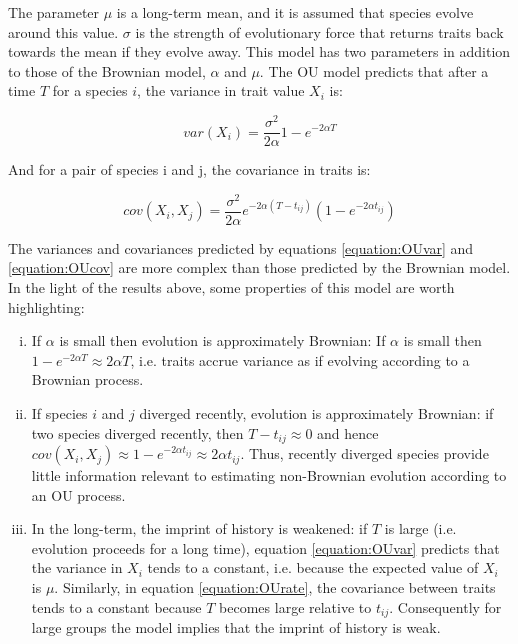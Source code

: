 \documentclass[a4paper,12pt]{article}
\begin{document}
  The parameter $\mu$ is a long-term mean, and it is assumed that species evolve around this value. 
  $\sigma$ is the strength of evolutionary force that returns traits back towards the mean if they evolve away. 
  This model has two parameters in addition to those of the Brownian model, $\alpha$ and $\mu$.
  The OU model predicts that after a time $T$ for a species $i$, the variance in trait value $X_i$ is:

    \begin{equation}
      var(X_i) = \frac{\sigma^2}{2 \alpha} 1 - e^{-2 \alpha T}
      \label{equation:OUvar} 
    \end{equation}

  And for a pair of species i and j, the covariance in traits is:

    \begin{equation}
      cov(X_i, X_j) = \frac{\sigma^2}{2 \alpha} e^{-2 \alpha (T - t_{ij})} (1 - e^{-2\alpha t_{ij}})
      \label{equation:OUcov} 
    \end{equation}

  The variances and covariances predicted by equations \ref{equation:OUvar} and \ref{equation:OUcov} are more complex than those predicted by the Brownian model. 
  In the light of the results above, some properties of this model are worth highlighting:

  \begin{enumerate}[(i)]
    \item If $\alpha$ is small then evolution is approximately Brownian: If $\alpha$ is small then $1 - e^{-2\alpha T} \approx 2\alpha T$, i.e. traits accrue variance as if evolving according to a Brownian process.\\ 

    \item If species $i$ and $j$ diverged recently, evolution is approximately Brownian: if two species diverged recently, then $T - t_{ij} \approx 0$ and hence $cov(X_i, X_j) \approx 1 - e^{-2\alpha t_{ij}} \approx 2\alpha t_{ij}$. 
    Thus, recently diverged species provide little information relevant to estimating non-Brownian evolution according to an OU process.\\ 

    \item In the long-term, the imprint of history is weakened: if $T$ is large (i.e. evolution proceeds for a long time), equation \ref{equation:OUvar} predicts that the variance in $X_i$ tends to a constant, i.e. because the expected value of $X_i$ is $\mu$. 
    Similarly, in equation \ref{equation:OUrate}, the covariance between traits tends to a constant because $T$ becomes large relative to $t_{ij}$.
    Consequently for large groups the model implies that the imprint of history is weak.\\
  \end{enumerate}
\end{document}
